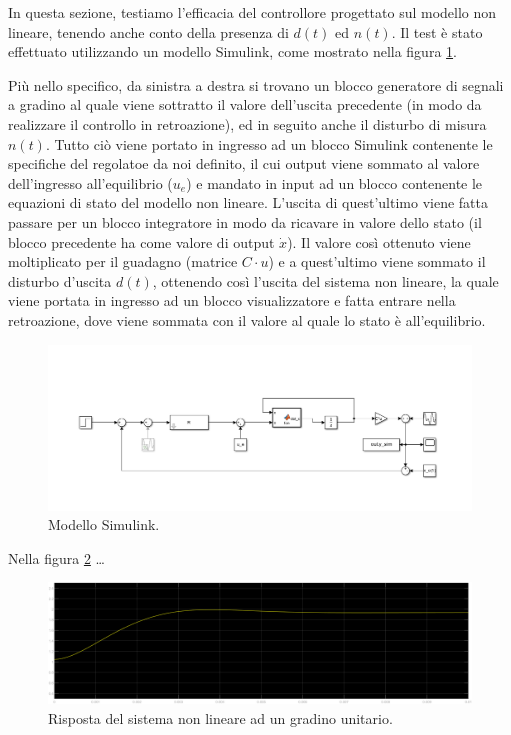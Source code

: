 \documentclass[a4paper, 11pt]{article}
\begin{document}
In questa sezione, testiamo l'efficacia del controllore progettato sul modello non lineare, tenendo anche conto della presenza di $d(t)$ ed $n(t)$. 
Il test \`e stato effettuato utilizzando un modello Simulink, come mostrato nella figura \ref*{fig:simulink}.

Pi\`u nello specifico,
da sinistra a destra si trovano un blocco generatore di segnali a gradino al quale viene sottratto il valore dell'uscita precedente (in modo da realizzare il controllo in retroazione), ed in seguito anche il disturbo di misura $n(t)$. 
Tutto ci\`o viene portato in ingresso ad un blocco Simulink contenente le specifiche del regolatoe da noi definito, il cui output viene sommato al valore dell'ingresso all'equilibrio ($u_e$) e mandato in input ad un blocco contenente
le equazioni di stato del modello non lineare. L'uscita di quest'ultimo viene fatta passare per un blocco integratore in modo da ricavare in valore dello stato (il blocco precedente ha come valore di output $\dot{x}$). Il valore cos\`i ottenuto 
viene moltiplicato per il guadagno (matrice $C\cdot u$) e a quest'ultimo viene sommato il disturbo d'uscita $d(t)$, ottenendo cos\`i l'uscita del sistema non lineare, la quale viene portata in ingresso ad un blocco visualizzatore e fatta entrare nella retroazione,
dove viene sommata con il valore al quale lo stato \`e all'equilibrio.


\begin{figure}[h!]
	\centering
	\includegraphics[width=0.9\linewidth]{./images/simulink1.png}
	\caption{Modello Simulink.}
	\label{fig:simulink}
\end{figure}

Nella figura \ref*{fig:step_response_non_lin_uni} \dots

\begin{figure}[h!]
	\centering
	\includegraphics[width=0.9\linewidth]{./images/stepRespNonLinUni.png}
	\caption{Risposta del sistema non lineare ad un gradino unitario.}
	\label{fig:step_response_non_lin_uni}
\end{figure}
\end{document}
